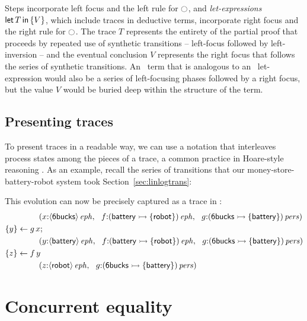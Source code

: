 Steps incorporate left focus and the left rule for ${\ocircle}$, and
{\it let-expressions} ${\sf let}\,{T}\,{\sf in}\,\{ {V} \}$, which include traces in deductive
terms, incorporate right focus and the right rule for
${\ocircle}$. The trace $T$ represents the entirety of the partial
proof that proceeds by repeated use of synthetic transitions --
left-focus followed by left-inversion -- and the eventual conclusion
$V$ represents the right focus that follows the series of synthetic
transitions. An \ollll~term that is analogous to an
\sls~let-expression would also be a series of left-focusing phases
followed by a right focus, but the value $V$ would be buried deep
within the structure of the term.

\subsection{Presenting traces}

To present traces in a readable way, we can use a notation that
interleaves process states among the pieces of a trace, a common
practice in Hoare-style reasoning \cite{hoare71proof}.  As an example,
recall the series of transitions that our money-store-battery-robot
system took Section~\ref{sec:linlogtrans}: 
%

%
This evolution can now be precisely captured as a trace in \sls:
\begin{align*}
&\qquad\qquad
\left(
 x{:}{\langle {\sf 6bucks} \rangle}\,{{\it eph}}, ~~
 f{:}{({\sf battery} \rightarrowtail \{ {\sf robot} \})}\,{{\it eph}}, ~~
 g{:}{({\sf 6bucks} \rightarrowtail \{ {\sf battery} \})}\,{{\it pers}}
\right)
\\
&\{{y}\} \leftarrow {g\,x};
\\
&\qquad\qquad
\left(
 y{:}{\langle {\sf battery} \rangle}\,{{\it eph}}, ~~
 f{:}{({\sf battery} \rightarrowtail \{ {\sf robot} \})}\,{{\it eph}}, ~~
 g{:}{({\sf 6bucks} \rightarrowtail \{ {\sf battery} \})}\,{{\it pers}}
\right)
\\
&\{{z}\} \leftarrow {f\,y}
\\
&\qquad\qquad
\left(
 z{:}{\langle {\sf robot} \rangle}\,{{\it eph}}, ~~
 g{:}{({\sf 6bucks} \rightarrowtail \{ {\sf battery} \})}\,{{\it pers}}
\right)
\end{align*}


\section{Concurrent equality}
\label{sec:linconcurrenteq}
\label{sec:framework-concurrenteq}

